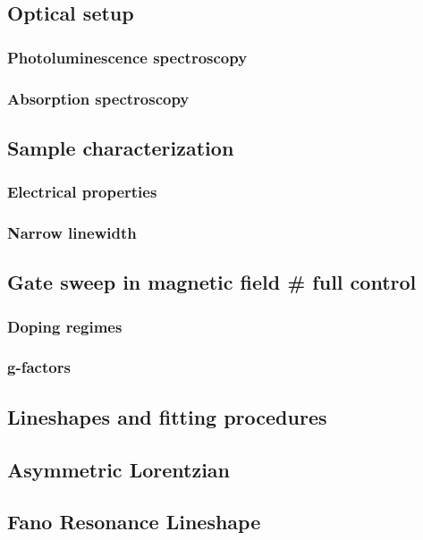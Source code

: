 \documentclass{scrbook}
\begin{document}
	\section{Optical setup}
		\subsection{Photoluminescence spectroscopy}
		\subsection{Absorption spectroscopy}
	\section{Sample characterization}
		\subsection{Electrical properties}
		\subsection{Narrow linewidth}
	\section{Gate sweep in magnetic field \# full control}
		\subsection{Doping regimes}
		\subsection{g-factors}

\begin{appendices}
\chapter{Lineshapes and fitting procedures}
	\section{Asymmetric Lorentzian}
	\section{Fano Resonance Lineshape}
\end{appendices}
\end{document}

